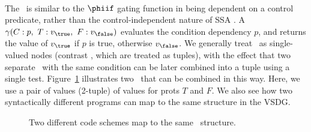 {\paragraph{\Gns}
The \Gn\ is similar to the $\phiif$ gating function in being dependent on a control predicate, rather than the control-independent nature of SSA \phifuns.
A \Gn\ $\gamma(C:p,\ T:v_{\true},\ F:v_{\false})$ evaluates the condition dependency $p$, and returns the value of $v_{\true}$ if $p$ is true, otherwise $v_{\false}$.
We generally treat \Gns\ as single-valued nodes (contrast \Tns, which are treated as tuples), with the effect that two separate \Gns\ with the same condition can be later combined into a tuple using a single test. 
Figure~\ref{fig:twinPhis} illustrates two \Gns\ that can be combined in this way. 
Here, we use a pair of values (2-tuple) of values for prots $T$ and $F$. 
We also see how two syntactically different programs can map to the same structure in the VSDG.

\begin{figure}[!hb]
\hfill
{}
\caption{Two different code schemes map to the same \Gn\ structure.}

\label{fig:twinPhis}
\end{figure}


}
